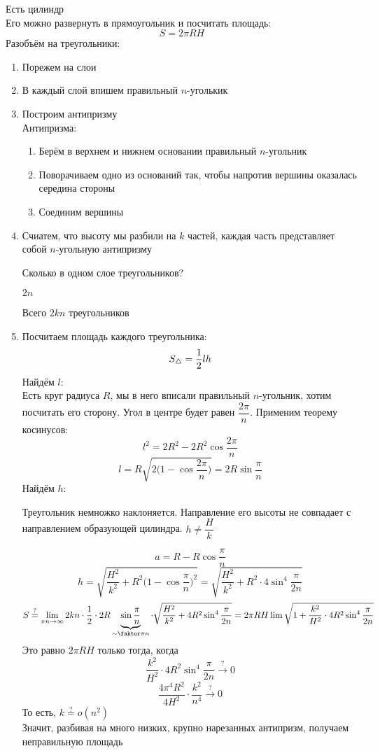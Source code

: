 \begin{eg}
	Есть цилиндр \\
	Его можно развернуть в прямоугольник и посчитать площадь:
	$$ S = 2\pi R H $$
	Разобъём на треугольники:
	\begin{enumerate}
		\item Порежем на слои
		\item В каждый слой впишем правильный $ n $-уголькик
		\item Построим антипризму \\
		Антипризма:
		\begin{enumerate}
			\item Берём в верхнем и нижнем основании правильный $ n $-угольник
			\item Поворачиваем одно из оснований так, чтобы напротив вершины оказалась середина стороны
			\item Соединим вершины
		\end{enumerate}
		\item Счиатем, что высоту мы разбили на $ k $ частей, каждая часть представляет собой $ n $-угольную антипризму
		\begin{quest}
			Сколько в одном слое треугольников?
		\end{quest}
		\begin{answer}
			$ 2n $
		\end{answer}
		Всего $ 2kn $ треугольников
		\item Посчитаем площадь каждого треугольника:
		$$ S_\triangle = \frac{1}2 lh $$
		Найдём $ l $: \\
		Есть круг радиуса $ R $, мы в него вписали правильный $ n $-угольник, хотим посчитать его сторону.  Угол в центре будет равен $ \dfrac{2\pi}n $. Применим теорему косинусов:
		$$ l^2 = 2R^2 - 2R^2 \cos \frac{2\pi}n $$
		$$ l = R \sqrt{2 \bigg( 1 - \cos \frac{2\pi}n \bigg) } = 2R\sin \frac\pi{n} $$
		Найдём $ h $:
		\begin{remark}
			Треугольник немножко наклоняется. Направление его высоты не совпадает с направлением образующей цилиндра. $ h \ne \dfrac{H}k $
		\end{remark}
		$$ a = R - R \cos \frac\pi{n} $$
		$$ h = \sqrt{\frac{H^2}{k^2} + R^2 \bigg(1 - \cos \frac\pi{n} \bigg)^2} = \sqrt{\frac{H^2}{k^2} + R^2 \cdot 4 \sin^4 \frac\pi{2n}} $$
		$$ S \stackrel?= \limi{\pi n} 2kn \cdot \half \cdot 2R\underbrace{\sin \frac\pi{n}}_{\sim \faktor\pi{n}} \cdot \sqrt{\frac{H^2}{k^2} + 4R^2 \sin^4 \frac\pi{2n}} = 2\pi RH \lim \sqrt{1 + \frac{k^2}{H^2} \cdot 4R^2 \sin^4 \frac\pi{2n}} $$
		Это равно $ 2\pi RH $ только тогда, когда
		$$ \frac{k^2}{H^2} \cdot 4R^2 \sin^4 \frac\pi{2n} \stackrel?\to 0 $$
		$$ \frac{4\pi^4R^2}{4H^2} \cdot \frac{k^2}{n^4} \stackrel?\to 0 $$
		То есть, $ k \stackrel?= o(n^2) $ \\
		Значит, разбивая на много низких, крупно нарезанных антипризм, получаем неправильную площадь
	\end{enumerate}
\end{eg}

